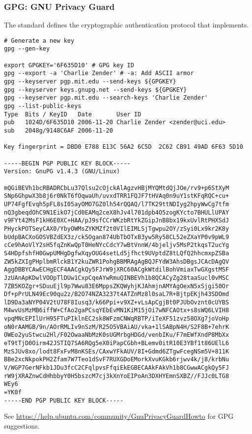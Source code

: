 \documentclass[12pt,twoside]{article}
\begin{document}
\subsubsection{GPG: GNU Privacy Guard}\label{sxn:GPG}
The  standard defines the cryptographic authentication 
protocol that  implements.
\begin{verbatim}
# Generate a new key
gpg --gen-key

export GPGKEY='6F635D10' # GPG key ID
gpg --export -a 'Charlie Zender' # -a: Add ASCII armor
gpg --keyserver pgp.mit.edu --send-keys ${GPGKEY}
gpg --keyserver keys.gnupg.net --send-keys ${GPGKEY}
gpg --keyserver pgp.mit.edu --search-keys 'Charlie Zender'
gpg --list-public-keys
Type  Bits / KeyID   Date       User ID
pub   1024D/6F635D10 2006-11-20 Charlie Zender <zender@uci.edu>
sub   2048g/9148C6AF 2006-11-20

Key fingerprint = DBD0 E788 E13C 56A2 6C5D  2C62 CB91 49AD 6F63 5D10

-----BEGIN PGP PUBLIC KEY BLOCK-----
Version: GnuPG v1.4.3 (GNU/Linux)

mQGiBEVh1bcRBADRCbLu37Qlsu2cOjckAlAgzvHBjMYQMtdQjJOe/rv9+p6StXyM
SNp6GhpwX3b8j6r0NkT6fOqwaUh/uvxdTRR1FQJF7tHVAq0n9uY1stKFqRQC+cu+
UP74FgfEvqh5pFL8sI05ayOMO7GZ0lh54rQQAQ/l7TK29ttNDIyg2hpyWwCg7tfm
nQ3gbeqdOhC9N1EikO7jCd0EAMq2ceX8hJv4l701dpb4O5zogKYcto7BHULlUPAY
v9FYt42MsF1kH6E0XC+HAA/pJ9sfCCrWKzbRtYkZGipJnB8bx19kxUvlRtPHXSdJ
PHyckPOTSeyCAX0/YbyOWMsZYKMZf2t0VIlEIMLSjTgwpu2OY/zSyi0Lx9kr2K8y
bUdpBACXoGOSVBZdEX3z/ck5Ogan874UbTbOTxB3yw5Ry58CL52eZXaYP0v9pWL9
cCe9hAoVlY2sH5fqZnKwQpT0HeNYcCdcY7wBtVnnW/4bjeljv5MsP2tkqsT2ucYg
S4HDpfshfH0GwpUMHgDgfwXqyOUG4setLd5jfhct9UVptdZ8tLQfQ2hhcmxpZSBa
ZW5kZXIgPHplbmRlckB1Y2kuZWR1PohgBBMRAgAgBQJFYdW3AhsDBgsJCAcDAgQV
AggDBBYCAwECHgECF4AACgkQy5FJrW9jXRC60ACgkWtdilBohVmiaxTwGXgstMSF
JzUAnApKDwlVOOpTlDUw1CxpCqeAYwRmuQINBEVh1b8QCACyZg28taaSucl0vMSC
7ZB5KOZgr+SDuuEjl9p7Wwu83E6MppsZKQWyhjKJAhmjnAMYAgOexN5xSjgi50Or
Df+pPrULN49Ec90qu2z/B2O74NZA3237t4ATZnMz8l0saL7R+BjtpEKjh43SDOmd
lD9Da3aNYP04V2tU78F8Iusq3/k66Ppi+v9XZ+vLsApCgjBt0PJUbOvznt0cUYBS
M4wvUsMzMB6iffW+CfAo2gaPCsqYEbEvMN1KiM15jOi7wNFCAOtx+s8sWQ6LVIH8
vpqMNcEPIlUrH95FTuPIklnEC2sk8WFzmCNWqRBTP/iTeXF51zvz58OXg7joVoHp
oN0rAAMGB/9n/AOrRMLIv9nSzM/R25O5VBAiAU/vka+1lSABpN4H/S2F8B+7ehrK
OWEo2yuStwcu2Hl/F02OwaaNbMzK0sUGMrbgHDGd/venbIKu/F7mEWfXndP8MbXx
eT9tTjD0Oirm42JSTIQ7SA6RQg5eX0iPapCGbh+BLemv0itR10E3YBf1t86UElL6
MzSJUv8xo/lodt8FxFvM8nKSEs/CAxwYFkAUV/8I+Gdmd6ZTgwFcegNSm5V+811K
BBe2xcNkpokPH2Zfam7W7Teo1dSvF7RUXGDoEMorkXvuKGkb6rjwv4k/j8/krbNu
V/WGP7GerNFkb1JDu3fcC2CFqlpvsFfqiEkEGBECAAkFAkVh1b8CGwwACgkQy5FJ
rW9jXRAZnwCdHhbbyY0H5bszcM7cj3kXnYoEIPoAn3DXHYEmnSXBZ//FJJc0LTG8
WEy6
=YK0f
-----END PGP PUBLIC KEY BLOCK-----
\end{verbatim}
See \url{https://help.ubuntu.com/community/GnuPrivacyGuardHowto}
for GPG suggestions.
\end{document}
